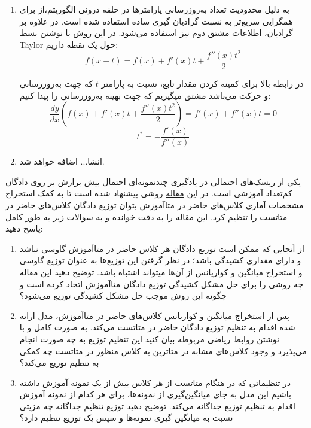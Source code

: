 \documentclass{article}
\begin{document}
\begin{enumerate}
	\item
	به دلیل محدودیت تعداد به‌روزرسانی پارامترها در حلقه درونی الگوریتم،‌از
	برای همگرایی سریع‌تر به نسبت گرادیان گیری ساده استفاده شده است.
	در
	علاوه بر گرادیان،‌ اطلاعات مشتق دوم نیز استفاده می‌شود.
	در این روش با نوشتن بسط Taylor حول یک نقطه داریم:
	$$
	f\left( {x + t} \right) = f\left( x \right) + f'\left( x \right)t + \frac{{f''\left( x \right){t^2}}}{2}
	$$
	
	در رابطه بالا برای کمینه کردن مقدار تابع، نسبت به پارامتر $t$ که جهت به‌روزرسانی و حرکت می‌باشد مشتق میگیریم که جهت بهینه به‌روزرسانی را پیدا کنیم:
	$$
	\frac{{dy}}{{dx}}\left( {f\left( x \right) + f'\left( x \right)t + \frac{{f''\left( x \right){t^2}}}{2}} \right) = f'\left( x \right) + f''\left( x \right)t = 0
	$$
	$$
	{t^*} =  - \frac{{f'\left( x \right)}}{{f''\left( x \right)}}
	$$
	
	\item
	انشا... اضافه خواهد شد.
	
\end{enumerate}


یکی از ریسک‌های احتمالی در یادگیری چندنمونه‌ای احتمال بیش برازش بر روی دادگان کم‌تعداد آموزشی است. در این
\href{https://arxiv.org/abs/2101.06395}{مقاله}
روشی پیشنهاد شده است تا به کمک استخراج مشخصات آماری کلاس‌های حاضر در متاآموزش بتوان توزیع دادگان کلاس‌های حاضر در متاتست را تنظیم کرد. این مقاله را به دقت خوانده و به سوالات زیر به طور کامل پاسخ دهید:

\begin{enumerate}

\item
از آنجایی که ممکن است توزیع دادگان هر کلاس حاضر در متاآموزش گاوسی نباشد و دارای مقداری کشیدگی باشد؛ در نظر گرفتن این توزیع‌ها به عنوان توزیع گاوسی و استخراج میانگین و کواریانس از آن‌ها میتواند اشتباه باشد. توضیح دهید این مقاله چه روشی را برای حل مشکل کشیدگی توزیع دادگان متاآموزش اتخاد کرده است و چگونه این روش موجب حل مشکل کشیدگی توزیع می‌شود؟

\item
پس از استخراج میانگین و کواریانس کلاس‌های حاضر در متاآموزش، مدل ارائه شده اقدام به تنظیم توزیع دادگان حاضر در متاتست می‌کند. به صورت کامل و با نوشتن روابط ریاضی مربوطه بیان کنید این تنظیم توزیع به چه صورت انجام می‌پذیرد و وجود کلاس‌های مشابه در متاترین به کلاس منظور در متاتست چه کمکی به تنظیم توزیع می‌کند؟

\item
در تنظیماتی که در هنگام متاتست از هر کلاس بیش از یک نمونه آموزش داشته باشیم این مدل به جای میانگین‌گیری از نمونه‌ها، برای هر کدام از 
نمونه آموزش اقدام به تنظیم توزیع جداگانه می‌کند. توضیح دهید توزیع تنظیم جداگانه چه مزیتی نسبت به میانگین گیری نمونه‌ها و سپس یک توزیع تنظیم دارد؟

\end{enumerate}
\end{document}
